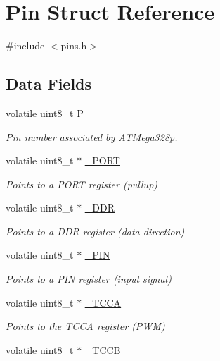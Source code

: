 \hypertarget{structPin}{}\section{Pin Struct Reference}
\label{structPin}


{\ttfamily \#include $<$pins.\+h$>$}

\subsection*{Data Fields}
\begin{DoxyCompactItemize}
\item 
volatile uint8\+\_\+t \mbox{\hyperlink{structPin_a618d69729d75bd51e89634bc81fcf49d}{P}}
\begin{DoxyCompactList}\small\item\em \mbox{\hyperlink{structPin}{Pin}} number associated by A\+T\+Mega328p. \end{DoxyCompactList}\item 
volatile uint8\+\_\+t $\ast$ \mbox{\hyperlink{structPin_a7ad2ae81751a3dd6e0ef0241a226b5bf}{\+\_\+\+P\+O\+RT}}
\begin{DoxyCompactList}\small\item\em Points to a P\+O\+RT register (pullup) \end{DoxyCompactList}\item 
volatile uint8\+\_\+t $\ast$ \mbox{\hyperlink{structPin_a47b066cff2835c1b135cad6677dad889}{\+\_\+\+D\+DR}}
\begin{DoxyCompactList}\small\item\em Points to a D\+DR register (data direction) \end{DoxyCompactList}\item 
volatile uint8\+\_\+t $\ast$ \mbox{\hyperlink{structPin_a22fa2dd8e8f6f82d434536ea9e517b91}{\+\_\+\+P\+IN}}
\begin{DoxyCompactList}\small\item\em Points to a P\+IN register (input signal) \end{DoxyCompactList}\item 
volatile uint8\+\_\+t $\ast$ \mbox{\hyperlink{structPin_a2fedb759a2179270a390e2020d001f85}{\+\_\+\+T\+C\+CA}}
\begin{DoxyCompactList}\small\item\em Points to the T\+C\+CA register (P\+WM) \end{DoxyCompactList}\item 
volatile uint8\+\_\+t $\ast$ \mbox{\hyperlink{structPin_a6e90b8ac6b2648d09ac6e7374bec1038}{\+\_\+\+T\+C\+CB}}

\end{DoxyCompactItemize}
